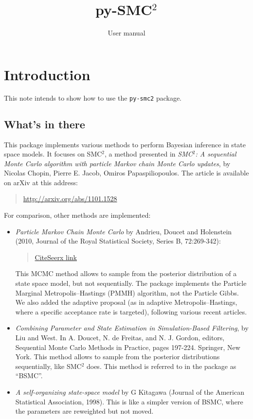 \documentclass[a4paper,10pt]{paper}
\title{py-SMC$^2$}
\author{User manual}
\newcommand{\pysmc}{\texttt{py-smc2}\xspace}
\begin{document}
\maketitle
\tableofcontents
\newpage

\section{Introduction}

This note intends to show how to use the \pysmc package. 

\subsection{What's in there}

This package
implements various methods to perform Bayesian inference in state space models.
It focuses on SMC$^2$, a method presented in \emph{SMC$^2$: A sequential Monte Carlo algorithm with particle Markov chain Monte Carlo updates}, by
Nicolas Chopin, Pierre E. Jacob, Omiros Papaspiliopoulos.
The article is available on arXiv at this address:
\begin{quote}
\href{http://arxiv.org/abs/1101.1528}{http://arxiv.org/abs/1101.1528}
\end{quote}


For comparison, other methods are implemented:
\begin{itemize}
 \item \emph{Particle Markov Chain Monte Carlo} by Andrieu, Doucet and Holenstein (2010, Journal of the Royal Statistical Society, Series B, 72:269-342):
\begin{quote}
\href{http://citeseerx.ist.psu.edu/viewdoc/download?doi=10.1.1.162.2808&rep=rep1&type=pdf}{CiteSeerx link}
\end{quote}
This MCMC method allows to sample from the posterior distribution of a state space model, but not sequentially.
The package implements the Particle Marginal Metropolis--Hastings (PMMH) algorithm, not the Particle Gibbs.
We also added the adaptive proposal (as in adaptive Metropolis--Hastings, where a specific acceptance rate is targeted),
following various recent articles.
\item \emph{Combining Parameter and State Estimation in Simulation-Based Filtering}, by Liu and West.
In A. Doucet, N. de Freitas, and N. J. Gordon, editors, Sequential Monte Carlo Methods in Practice, pages 197-224. Springer, New York.
This method allows to sample from the posterior distributions sequentially, like SMC$^2$ does. This method is referred to in the package as ``BSMC''.
\item \emph{A self-organizing state-space model} by G Kitagawa (Journal of the American Statistical Association, 1998).
This is like a simpler version of BSMC, where the parameters are reweighted but not moved.
\end{itemize}
\end{document}
